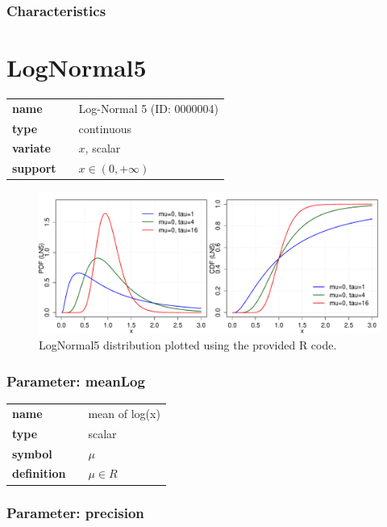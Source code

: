 \subsubsection*{Characteristics}
\smallskip
\section*{LogNormal5} 

  \bigskip 

\begin{tabular}{p{2cm}cl}
\textbf{name} & & Log-Normal 5 (ID: 0000004)\\ 
 
\textbf{type} & & continuous \\ 

\textbf{variate} & & $x$, scalar \\ 

\textbf{support} & & $x \in (0,+\infty)$
\end{tabular}

\begin{figure}[ht!]
\centering
  \includegraphics[width=140mm]{pics/LogNormal5.pdf}
 \caption{LogNormal5 distribution plotted using the provided R code.}
 \label{fig:LogNormal5}
\end{figure}

\subsubsection*{Parameter: meanLog}

\noindent\begin{tabular}{p{2cm}cl}
\textbf{name} & & mean of log(x) \\
\textbf{type} & & scalar \\
\textbf{symbol} & & $\mu$  \\
\textbf{definition} & & $\mu \in R$
\end{tabular}
\subsubsection*{Parameter: precision}

